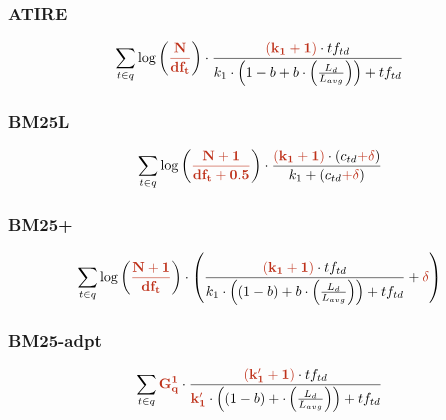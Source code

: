 \subsubsection{ATIRE}

\begin{equation}
	\sum_{t\in q}\log\left(\mathbf{\begingroup\color{ruhuisstijlrood}\frac{N}{df_t}\endgroup}\right)\cdot\frac{\mathbf{\begingroup\color{ruhuisstijlrood}\left(k_1 + 1\right)\endgroup}\cdot tf_{td}}{k_1\cdot\left(1-b+b\cdot\left(\frac{L_{d}}{L_{avg}}\right)\right)+tf_{td}}
\end{equation}

\subsubsection{BM25L}

\begin{equation}
	\sum_{t\in q} \log\left(\mathbf{\begingroup\color{ruhuisstijlrood}\frac{N+1}{df_t + 0.5}\endgroup}\right)\cdot\frac{\mathbf{\begingroup\color{ruhuisstijlrood}(k_1 + 1)\endgroup}\cdot(c_{td} \mathbf{\begingroup\color{ruhuisstijlrood}+ \delta\endgroup})}{k_1 + (c_{td} \mathbf{\begingroup\color{ruhuisstijlrood}+ \delta\endgroup})}
\end{equation}

\subsubsection{BM25+}

\begin{equation}
	\sum_{t\in q} \log\left(\mathbf{\begingroup\color{ruhuisstijlrood}\frac{N+1}{df_t}\endgroup}\right)\cdot\left(\frac{\mathbf{\begingroup\color{ruhuisstijlrood}\left(k_1 + 1\right)\endgroup}\cdot tf_{td}}{k_1\cdot\left(\left(1-b\right)+b\cdot\left(\frac{L_d}{L_{avg}}\right)\right)+tf_{td}}+\mathbf{\begingroup\color{ruhuisstijlrood}\delta\endgroup}\right)
\end{equation}

\subsubsection{BM25-adpt}

\begin{equation}
	\sum_{t\in q}\mathbf{\begingroup\color{ruhuisstijlrood}G_q^1\endgroup}\cdot\frac{\mathbf{\begingroup\color{ruhuisstijlrood}\left(k'_1+1\right)\endgroup}\cdot tf_{td}}{\mathbf{\begingroup\color{ruhuisstijlrood}k'_1\endgroup}\cdot\left(\left(1-b\right)+\cdot\left(\frac{L_d}{L_{avg}}\right)\right)+tf_{td}}
\end{equation}

